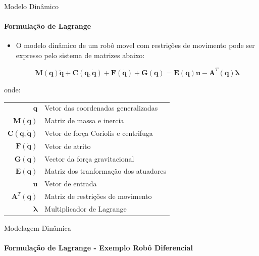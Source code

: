 \documentclass{beamer}
\begin{document}
\begin{frame}{Modelo Dinâmico}
    \framesubtitle{Formulação de Lagrange}
    \begin{itemize}
        \item O modelo dinâmico de um robô movel com restrições de movimento pode ser expresso pelo sistema de matrizes abaixo:

              \begin{equation}
                  \mathbf{M(q)\ddot{q}+ C(q, \dot{q})+ F(\dot{q})+G(q) = E(q)u -A}^T\mathbf{(q)}\boldsymbol{\lambda}
              \end{equation}
    \end{itemize}

    \begin{block}{}
        \scriptsize{
            onde:
            \begin{tabular}{ r | l }
                $\mathbf{q}$               & Vetor das coordenadas generalizadas   \\
                $\mathbf{M(q)}$            & Matriz de massa e inercia             \\
                $\mathbf{C(q, \dot{q})}$   & Vetor de força Coriolis e centrifuga  \\
                $\mathbf{F(\dot{q})}$      & Vetor de atrito                       \\
                $\mathbf{G(q)}$            & Vector da força gravitacional         \\
                $\mathbf{E(q)}$            & Matriz dos tranformação dos atuadores \\
                $\mathbf{u}$               & Vetor de entrada                      \\
                $\mathbf{A}^T\mathbf{(q)}$ & Matriz de restrições de movimento     \\
                $\boldsymbol{\lambda}$     & Multiplicador de Lagrange             \\
            \end{tabular}}
    \end{block}
\end{frame}



\begin{frame}{Modelagem Dinâmica}
    \framesubtitle{Formulação de Lagrange - Exemplo Robô Diferencial}
\end{frame}
\end{document}
